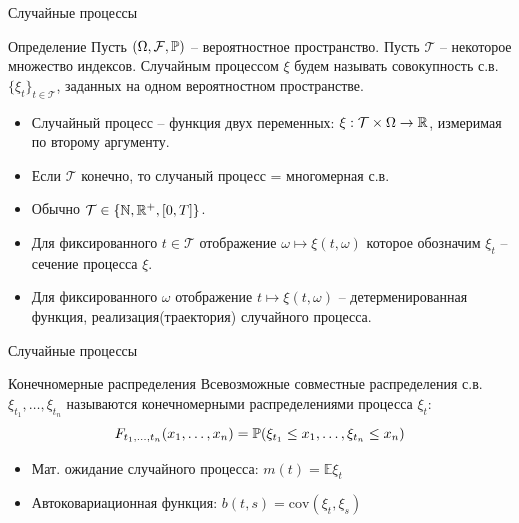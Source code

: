 \documentclass{beamer}
\begin{document}
\begin{frame}{Случайные процессы}
\begin{block}{Определение}
    Пусть $(\Omega, \mathcal{F}, \mathbb{P})$ -- вероятностное пространство. Пусть $\mathcal{T}$ -- некоторое множество индексов. Случайным процессом $\xi$ будем называть совокупность с.в. $\{\xi_t\}_{t\in \mathcal{T}}$, заданных на одном вероятностном пространстве.
\end{block}
\begin{itemize}
    \item Случайный процесс -- функция двух переменных: $\xi : \mathcal{T} \times \Omega \to \mathbb{R}$, измеримая по второму аргументу.
    \item Если $\mathcal{T}$ конечно, то случаный процесс = многомерная с.в.
    \item Обычно $\mathcal{T} \in \{ \mathbb{N}, \mathbb{R}^+, [0, T]\}$.
    \item Для фиксированного $t\in \mathcal{T}$ отображение 
    $\omega \mapsto\xi(t, \omega)$  которое обозначим $\xi_t$ -- сечение процесса $\xi$.
    \item Для фиксированного $\omega$ отображение $t \mapsto \xi(t, \omega)$ -- детерменированная функция, реализация(траектория) случайного процесса.
\end{itemize}

\end{frame}

\begin{frame}{Случайные процессы}
    \begin{block}{Конечномерные распределения}
    Всевозможные совместные распределения с.в. $\xi_{t_1}, \ldots, \xi_{t_n}$ называются конечномерными распределениями процесса $\xi_t$:
    $$
        F_{t_1, \ldots, t_n} (x_1, \ldots, x_n) = \mathbb{P}(\xi_{t_1} \leq x_1, \ldots, \xi_{t_n} \leq x_n)
    $$
\end{block}
\begin{itemize}
    \item Мат. ожидание случайного процесса: $m(t)=\mathbb{E} \xi_t$
    \item Автоковариационная функция: $b(t, s) = \mathrm{cov}(\xi_t, \xi_s)$
\end{itemize}
\end{frame}
\end{document}
